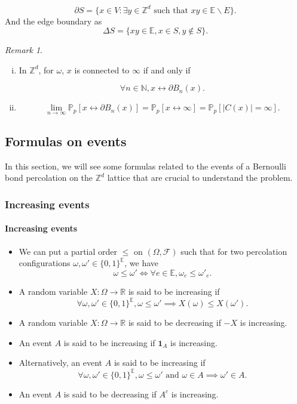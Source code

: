 \documentclass[a4paper,11pt]{article}
\theoremstyle{plain}
\theoremstyle{definition}
\theoremstyle{remark}
\newtheorem*{remark}{Remark}
\begin{document}
\[ \partial S = \{x \in V : \exists y \in \mathbb{Z}^d \text{ such that } xy \in \mathbb{E}\backslash E\}.\]
And the edge boundary as
\[ \Delta S = \{xy \in \mathbb{E}, x \in S, y \not\in S\}. \]

\begin{remark}
\text{}
\begin{enumerate}[(i)]
\item In $\mathbb{Z}^d$, for $\omega$, $x$ is connected to $\infty$ if and only if

\[ \forall n \in \mathbb{N}, x \longleftrightarrow \partial B_n(x). \]
\item \[ \lim_{n \rightarrow \infty}{\mathbb{P}_p[x \longleftrightarrow \partial B_n(x)]} = \mathbb{P}_p[x \longleftrightarrow \infty] = \mathbb{P}_p[|C(x)| = \infty].\]
\end{enumerate}
\end{remark}

\subsection{Formulas on events}
In this section, we will see some formulas related to the events of a Bernoulli bond percolation on the $\mathbb{Z}^d$ lattice that are crucial to understand the problem.
\subsubsection{Increasing events}
\paragraph{Increasing events}
\begin{itemize}
    \item We can put a partial order $\leq$ on $(\Omega, \mathscr{F})$ such that for two percolation configurations $\omega, \omega' \in \{0,1\}^\mathbb{E}$, we have
    \[ \omega \leq \omega' \Longleftrightarrow \forall e \in \mathbb{E}, \omega_e \leq \omega'_e. \]

    \item A random variable $X : \Omega \longrightarrow \mathbb{R}$ is said to be increasing if
    \[ \forall \omega, \omega' \in \{0,1\}^\mathbb{E}, \omega \leq \omega' \implies X(\omega) \leq X(\omega'). \]
    
    \item A random variable $X : \Omega \longrightarrow \mathbb{R}$ is said to be decreasing if $-X$ is increasing.
    
    \item An event $A$ is said to be increasing if $\mathbf{1}_A$ is increasing.
    
    \item Alternatively, an event $A$ is said to be increasing if
    \[ \forall \omega, \omega' \in \{0,1\}^\mathbb{E}, \omega \leq \omega' \text{ and }  \omega \in A \implies \omega' \in A. \]
    
    \item An event $A$ is said to be decreasing if $A^c$ is increasing.
\end{itemize}
\end{document}
